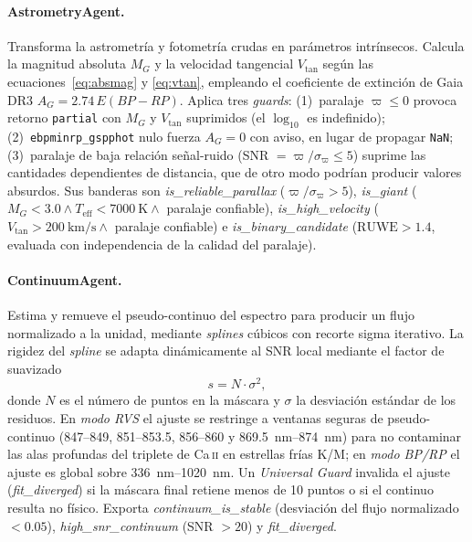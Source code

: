 \paragraph{AstrometryAgent.} Transforma la astrometría y fotometría crudas en
parámetros intrínsecos. Calcula la magnitud absoluta $M_G$ y la velocidad
tangencial $V_\mathrm{tan}$ según las ecuaciones~\eqref{eq:absmag} y
\eqref{eq:vtan}, empleando el coeficiente de extinción de Gaia DR3
$A_G = 2.74\,E(BP\!-\!RP)$. Aplica tres \emph{guards}: (1)~paralaje
$\varpi \le 0$ provoca retorno \texttt{partial} con $M_G$ y $V_\mathrm{tan}$
suprimidos (el $\log_{10}$ es indefinido); (2)~\verb|ebpminrp_gspphot| nulo fuerza
$A_G = 0$ con aviso, en lugar de propagar \texttt{NaN}; (3)~paralaje de baja
relación señal-ruido (SNR $= \varpi/\sigma_\varpi \le 5$) suprime las cantidades
dependientes de distancia, que de otro modo podrían producir valores absurdos. Sus
banderas son \emph{is\_reliable\_parallax} ($\varpi/\sigma_\varpi > 5$),
\emph{is\_giant} ($M_G < 3.0 \wedge T_\mathrm{eff} < \SI{7000}{\kelvin} \wedge$
paralaje confiable), \emph{is\_high\_velocity}
($V_\mathrm{tan} > \SI{200}{\kilo\meter\per\second} \wedge$ paralaje confiable) e
\emph{is\_binary\_candidate} ($\mathrm{RUWE} > 1.4$, evaluada con independencia de
la calidad del paralaje).

\paragraph{ContinuumAgent.} Estima y remueve el pseudo-continuo del espectro para
producir un flujo normalizado a la unidad, mediante \emph{splines} cúbicos con
recorte sigma iterativo. La rigidez del \emph{spline} se adapta dinámicamente al
SNR local mediante el factor de suavizado
\begin{equation}
  s = N \cdot \sigma^2,
  \label{eq:smoothing}
\end{equation}
donde $N$ es el número de puntos en la máscara y $\sigma$ la desviación estándar
de los residuos. En \emph{modo RVS} el ajuste se restringe a ventanas seguras de
pseudo-continuo (\SIrange{847}{849}{}, \SIrange{851}{853.5}{}, \SIrange{856}{860}{}
y \SIrange{869.5}{874}{\nano\meter}) para no contaminar las alas profundas del
triplete de Ca\,\textsc{ii} en estrellas frías K/M; en \emph{modo BP/RP} el ajuste
es global sobre \SIrange{336}{1020}{\nano\meter}. Un \emph{Universal Guard}
invalida el ajuste (\emph{fit\_diverged}) si la máscara final retiene menos de
\num{10} puntos o si el continuo resulta no físico. Exporta
\emph{continuum\_is\_stable} (desviación del flujo normalizado $< 0.05$),
\emph{high\_snr\_continuum} (SNR $> 20$) y \emph{fit\_diverged}.

